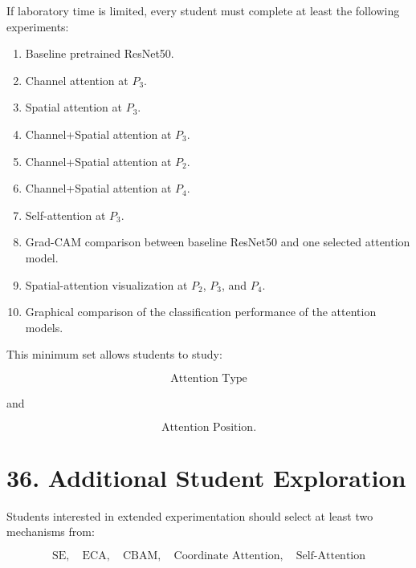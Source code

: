 \documentclass[10pt]{article}
\begin{document}
If laboratory time is limited, every student must complete at least the
following experiments:

\begin{enumerate}

\item Baseline pretrained ResNet50.

\item Channel attention at $P_3$.

\item Spatial attention at $P_3$.

\item Channel+Spatial attention at $P_3$.

\item Channel+Spatial attention at $P_2$.

\item Channel+Spatial attention at $P_4$.

\item Self-attention at $P_3$.

\item Grad-CAM comparison between baseline ResNet50 and one selected
attention model.

\item Spatial-attention visualization at $P_2$, $P_3$, and $P_4$.

\item Graphical comparison of the classification performance of the attention
models.

\end{enumerate}

This minimum set allows students to study:

\[
\boxed{\text{Attention Type}}
\]

and

\[
\boxed{\text{Attention Position}}.
\]

\section*{36. Additional Student Exploration}

Students interested in extended experimentation should select at least two
mechanisms from:

\[
\boxed{
\text{SE},
\quad
\text{ECA},
\quad
\text{CBAM},
\quad
\text{Coordinate Attention},
\quad
\text{Self-Attention}
}
\]
\end{document}
